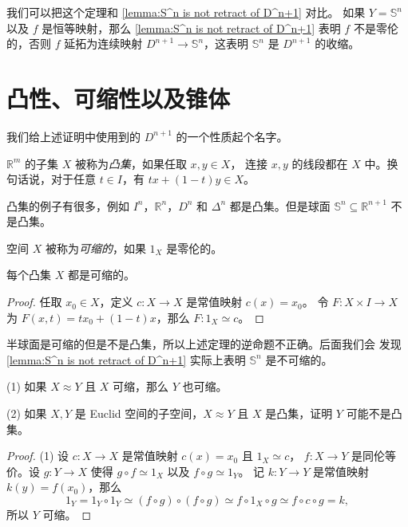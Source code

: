 \documentclass[fontset=none]{Notes}
\begin{document}
我们可以把这个定理和 \autoref{lemma:S^n is not retract of D^n+1} 对比。
如果 $Y=\mathbb{S}^n$ 以及 $f$ 是恒等映射，那么 \autoref{lemma:S^n is not retract of D^n+1}
表明 $f$ 不是零伦的，否则 $f$ 延拓为连续映射 $D^{n+1}\to \mathbb{S}^n$，这表明
$\mathbb{S}^n$ 是 $D^{n+1}$ 的收缩。

\section{凸性、可缩性以及锥体}

我们给上述证明中使用到的 $D^{n+1}$ 的一个性质起个名字。

\begin{definition}
  $\mathbb{R}^m$ 的子集 $X$ 被称为\emph{凸集}，如果任取 $x,y\in X$，
  连接 $x,y$ 的线段都在 $X$ 中。换句话说，对于任意 $t\in I$，有
  $tx+(1-t)y\in X$。
\end{definition}

凸集的例子有很多，例如 $I^n$，$\mathbb{R}^n$，$D^n$ 和 $\Delta^n$
都是凸集。但是球面 $\mathbb{S}^n\subseteq \mathbb{R}^{n+1}$
不是凸集。

\begin{definition}
  空间 $X$ 被称为\emph{可缩的}，如果 $1_X$ 是零伦的。
\end{definition}

\begin{theorem}
  每个凸集 $X$ 都是可缩的。
\end{theorem}
\begin{proof}
  任取 $x_0\in X$，定义 $c:X\to X$ 是常值映射 $c(x)=x_0$。
  令 $F:X\times I\to X$ 为 $F(x,t)=tx_0+(1-t)x$，那么 $F:1_X\simeq c$。
\end{proof}

半球面是可缩的但是不是凸集，所以上述定理的逆命题不正确。后面我们会
发现 \autoref{lemma:S^n is not retract of D^n+1} 实际上表明
$\mathbb{S}^n$ 是不可缩的。

\begin{problem}{}{}
  (1) 如果 $X\approx Y$ 且 $X$ 可缩，那么 $Y$ 也可缩。

  (2) 如果 $X,Y$ 是 Euclid 空间的子空间，$X\approx Y$ 且 $X$
  是凸集，证明 $Y$ 可能不是凸集。 
\end{problem}
\begin{proof}
  (1) 设 $c:X\to X$ 是常值映射 $c(x)=x_0$ 且 $1_X\simeq c$，
  $f:X\to Y$ 是同伦等价。设 $g:Y\to X$
  使得 $g\circ f\simeq 1_X$ 以及 $f\circ g\simeq 1_Y$。
  记 $k:Y\to Y$ 是常值映射 $k(y)=f(x_0)$，那么
  \[
    1_Y=1_Y \circ 1_Y\simeq 
    (f\circ g)\circ (f\circ g)\simeq f\circ 1_X\circ g
    \simeq f\circ c\circ g=k,
  \]
  所以 $Y$ 可缩。
\end{proof}
\end{document}
